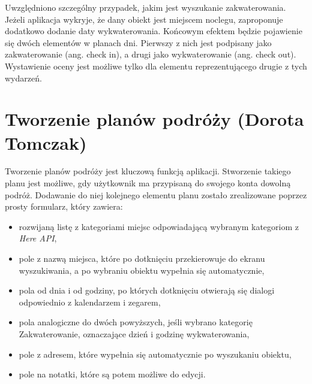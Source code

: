 \par Uwzględniono szczególny przypadek, jakim jest wyszukanie zakwaterowania. Jeżeli aplikacja wykryje, że dany obiekt jest miejscem noclegu, zaproponuje dodatkowo dodanie daty wykwaterowania. Końcowym efektem będzie pojawienie się dwóch elementów w planach dni. Pierwszy z nich jest podpisany jako zakwaterowanie (ang. check in), a drugi jako wykwaterowanie (ang. check out). Wystawienie oceny jest możliwe tylko dla elementu reprezentującego drugie z tych wydarzeń.


\section{Tworzenie planów podróży (Dorota Tomczak)}
\par Tworzenie planów podróży jest kluczową funkcją aplikacji. Stworzenie takiego planu jest możliwe, gdy użytkownik ma przypisaną do swojego konta dowolną podróż. Dodawanie do niej kolejnego elementu planu zostało zrealizowane poprzez prosty formularz, który zawiera:
\begin{itemize}
\item rozwijaną listę z kategoriami miejsc odpowiadającą wybranym kategoriom z \textit{Here API}\cite{Here},
\item pole z nazwą miejsca, które po dotknięciu przekierowuje do ekranu wyszukiwania, a po wybraniu obiektu wypełnia się automatycznie,
\item pola od dnia i od godziny, po których dotknięciu otwierają się dialogi odpowiednio z kalendarzem i zegarem,
\item pola analogiczne do dwóch powyższych, jeśli wybrano kategorię Zakwaterowanie, oznaczające dzień i godzinę wykwaterowania,
\item pole z adresem, które wypełnia się automatycznie po wyszukaniu obiektu,
\item pole na notatki, które są potem możliwe do edycji.
\end{itemize}

